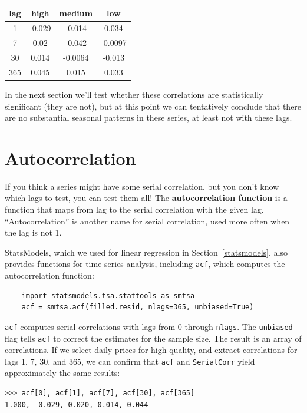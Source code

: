 \documentclass[12pt]{book}
\theoremstyle{exercise}
\begin{document}
\begin{center}
\begin{tabular}{|c|c|c|c|}
\hline
lag & high & medium & low \\ \hline
1 & -0.029 & -0.014 & 0.034 \\
7 & 0.02 & -0.042 & -0.0097 \\
30 & 0.014 & -0.0064 & -0.013 \\
365 & 0.045 & 0.015 & 0.033 \\
\hline
\end{tabular}
\end{center}

In the next section we'll test whether these correlations are
statistically significant (they are not), but at this point we can
tentatively conclude that there are no substantial seasonal patterns
in these series, at least not with these lags.%
%


\section{Autocorrelation}

If you think a series might have some serial correlation, but you
don't know which lags to test, you can test them all!  The {\bf
  autocorrelation function} is a function that maps from lag to the
serial correlation with the given lag.  ``Autocorrelation'' is another
name for serial correlation, used more often when the lag is not 1.%

StatsModels, which we used for linear regression in
Section~\ref{statsmodels}, also provides functions for time series
analysis, including {\tt acf}, which computes the autocorrelation
function:%

\begin{verbatim}
    import statsmodels.tsa.stattools as smtsa
    acf = smtsa.acf(filled.resid, nlags=365, unbiased=True)
\end{verbatim}

{\tt acf} computes serial correlations with
lags from 0 through {\tt nlags}.  The {\tt unbiased} flag tells
{\tt acf} to correct the estimates for the sample size.  The result
is an array of correlations.  If we select daily prices for high
quality, and extract correlations for lags 1, 7, 30, and 365, we can
confirm that {\tt acf} and {\tt SerialCorr} yield approximately
the same results:%

\begin{verbatim}
>>> acf[0], acf[1], acf[7], acf[30], acf[365]
1.000, -0.029, 0.020, 0.014, 0.044
\end{verbatim}
\end{document}
